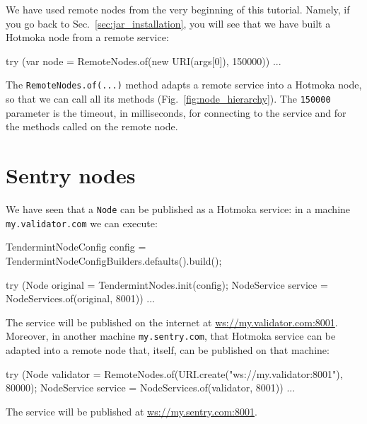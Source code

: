 We have used remote nodes from the very beginning of this tutorial.
Namely, if you go back to Sec.~\ref{sec:jar_installation},
you will see that we have built a Hotmoka node from a remote service:
%
\begin{codebox}\begin{javalst}
try (var node = RemoteNodes.of(new URI(args[0]), 150000)) {
  ...
}
\end{javalst}\end{codebox}
%
The \texttt{RemoteNodes.of(...)} method adapts a remote service into a Hotmoka node,
so that we can call all its methods (Fig.~\ref{fig:node_hierarchy}). The
\texttt{150000} parameter is the timeout, in milliseconds, for connecting to the service
and for the methods called on the remote node.

\section{Sentry nodes}\label{sec:sentry_nodes}

We have seen that a \texttt{Node} can be published as a Hotmoka service:
in a machine \texttt{my.validator.com} we can execute:
%
\begin{codebox}\begin{javalst}
TendermintNodeConfig config = TendermintNodeConfigBuilders.defaults().build();

try (Node original = TendermintNodes.init(config);
  NodeService service = NodeServices.of(original, 8001)) {
  ...
}
\end{javalst}\end{codebox}
%
The service will be published on the internet at \url{ws://my.validator.com:8001}.
Moreover, in another machine \texttt{my.sentry.com},
that Hotmoka service can be adapted into a remote node
that, itself, can be published on that machine:
%
\begin{codebox}\begin{javalst}
try (Node validator = RemoteNodes.of(URI.create("ws://my.validator:8001"), 80000);
  NodeService service = NodeServices.of(validator, 8001)) {
  ...
}
\end{javalst}\end{codebox}
%
The service will be published at \url{ws://my.sentry.com:8001}.


